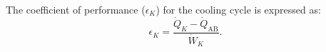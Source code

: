 The coefficient of performance (\(\epsilon_K\)) for the cooling cycle is expressed as:  
\[
\epsilon_K = \frac{\dot{Q}_K - \dot{Q}_{\text{AB}}}{\dot{W}_K}.
\]